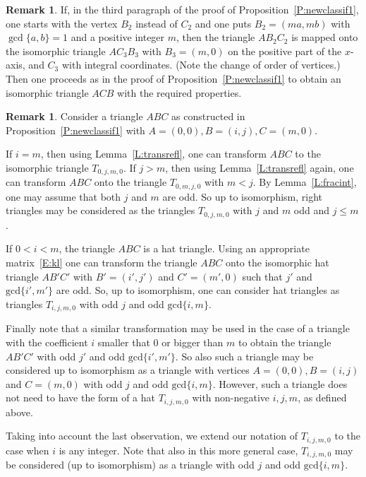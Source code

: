\documentclass[12pt]{amsart}
\def\mr{\mathrm}
\theoremstyle{plain}
\theoremstyle{definition}
\newtheorem{remark}[theorem]{Remark}
\numberwithin{equation}{section}
\begin{document}
\begin{remark}\label{R:b2c2}
If, in the third paragraph of the proof of Proposition~\ref{P:newclassif1}, one starts with the vertex $B_2$ instead of $C_2$ and one puts $B_2 = (ma,mb)$ with $\gcd\{a,b\} = 1$ and a positive integer $m$, then the triangle $AB_2C_2$ is mapped onto the isomorphic triangle $AC_3B_3$ with $B_3 = (m,0)$ on the positive part of the $x$-axis, and $C_3$ with integral coordinates. (Note the change of order of vertices.) Then one proceeds as in the proof of
Proposition~\ref{P:newclassif1} to obtain an isomorphic triangle $ACB$ with the required properties.
\end{remark}



\begin{remark}\label{R:rightshats}
Consider a triangle $ABC$ as constructed in Proposition~\ref{P:newclassif1} with $A = (0,0), B
=(i,j), C = (m,0)$.

If $i = m$, then using Lemma~\ref{L:transrefl}, one can transform $ABC$ to the isomorphic
triangle $T_{0,j,m,0}$. If $j > m$, then using Lemma~\ref{L:transrefl} again, one can transform $ABC$ onto the triangle $T_{0,m,j,0}$ with $m < j$. By Lemma~\ref{L:fracint}, one may assume that both $j$ and $m$ are odd. So up to isomorphism, right triangles may be considered as the triangles $T_{0,j,m,0}$ with $j$ and $m$ odd and $j \leq m$.

If $0 < i < m$, the triangle $ABC$ is a hat triangle. Using an appropriate matrix~\eqref{E:kl}
one can transform the triangle $ABC$ onto the isomorphic hat triangle $AB'C'$ with $B' =
(i',j')$ and $C' = (m',0)$ such that $j'$ and $\mr{gcd}\{i',m'\}$ are odd. So, up to
isomorphism, one can consider hat triangles as triangles $T_{i,j,m,0}$ with odd $j$ and odd
$\mr{gcd}\{i,m\}$.

Finally note that a similar transformation may be used in the case of a triangle with the
coefficient $i$ smaller that $0$ or bigger than $m$ to obtain the triangle $AB'C'$ with odd $j'$ and odd $\mr{gcd}\{i',m'\}$. So also such a triangle may be considered up to isomorphism as a triangle with vertices $A = (0,0), B = (i,j)$ and $C = (m,0)$ with odd $j$ and odd
$\mr{gcd}\{i,m\}$.
However, such a triangle does not need to have the form of a hat $T_{i,j,m,0}$ with non-negative $i,j,m$, as defined above.
\end{remark}

Taking into account the last observation, we extend our notation of $T_{i,j,m,0}$ to the case
when $i$ is any integer. Note that also in this more general case, $T_{i,j,m,0}$ may be
considered (up to isomorphism) as a triangle with odd $j$ and odd $\mr{gcd}\{i,m\}$.
\end{document}
